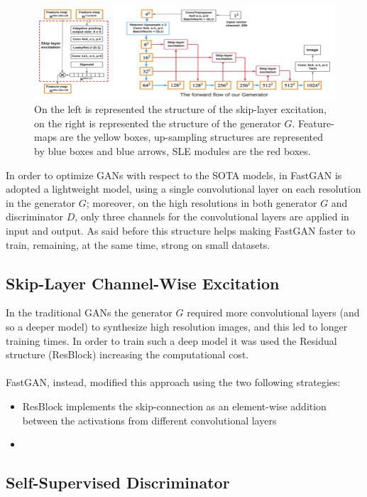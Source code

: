 \documentclass[12pt]{article}
\begin{document}
\begin{figure}[H]
	\includegraphics[width=1\textwidth]{Images/structure.png}
	\caption{
		On the left is represented the structure of the skip-layer excitation,
		on the right is represented the structure of the generator $G$. 
		Feature-maps are the yellow boxes, up-sampling structures are represented 
		by blue boxes and blue arrows, SLE modules are the red boxes.
		}
\end{figure}
In order to optimize GANs with respect to the SOTA models, in FastGAN is adopted a lightweight model, 
using a single convolutional layer on each resolution in the generator $G$; moreover, on the high resolutions
in both generator $G$ and discriminator $D$, only three channels for the convolutional layers are applied in 
input and output. As said before this structure helps making FastGAN faster to train, remaining, at the same time,
strong on small datasets. 

\subsection{Skip-Layer Channel-Wise Excitation}

In the traditional GANs the generator $G$ required more convolutional layers (and so a deeper model) to synthesize 
high resolution images, and this led to longer training times. 
In order to train such a deep model it was used the Residual structure (ResBlock) increasing the computational cost. \\\\
FastGAN, instead, modified this approach using the two following strategies:
\begin{itemize}
	\setlength\itemsep{0.01em}
	\item {	
	ResBlock implements the skip-connection as an element-wise addition between the activations from different
	convolutional layers
	}
	\item {

	}
\end{itemize} 

\subsection{Self-Supervised Discriminator}
\end{document}
